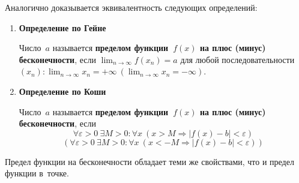 Аналогично доказывается эквивалентность следующих определений:
\begin{enumerate}
	\item \textbf{Определение по Гейне}
	
	Число~$a$ называется \textbf{пределом функции~$f(x)$ на плюс (минус) бесконечности}, если $\displaystyle \lim_{n \to \infty} f(x_n) = a$ для любой последовательности~$\displaystyle (x_n): \lim_{n \to \infty} x_n = +\infty \ (\lim_{n \to \infty} x_n = -\infty)$.
	
	\item \textbf{Определение по Коши}
	
	Число~$a$ называется \textbf{пределом функции~$f(x)$ на плюс (минус) бесконечности}, если
	\begin{equation*}
	\forall \varepsilon > 0 \ \exists M > 0 \colon \forall x \ (x > M \Rightarrow |f(x) - b| < \varepsilon)
	\end{equation*}
	\begin{equation*}
	(\forall \varepsilon > 0 \ \exists M > 0 \colon \forall x \ (x < -M \Rightarrow |f(x) - b| < \varepsilon))
	\end{equation*}
\end{enumerate}

Предел функции на бесконечности обладает теми же свойствами, что и предел функции в~точке.